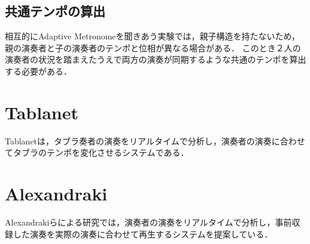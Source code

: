 \subsection{共通テンポの算出}
相互的にAdaptive Metronomeを聞きあう実験では，親子構造を持たないため，親の演奏者と子の演奏者のテンポと位相が異なる場合がある．
このとき２人の演奏者の状況を踏まえたうえで両方の演奏が同期するような共通のテンポを算出する必要がある．

\section{Tablanet}
Tablanet\cite{tablanet}は，タブラ奏者の演奏をリアルタイムで分析し，演奏者の演奏に合わせてタブラのテンポを変化させるシステムである．

\section{Alexandraki}
Alexandrakiらによる研究\cite{alexandraki:2013}\cite{alexandraki:2014}では，演奏者の演奏をリアルタイムで分析し，事前収録した演奏を実際の演奏に合わせて再生するシステムを提案している．


